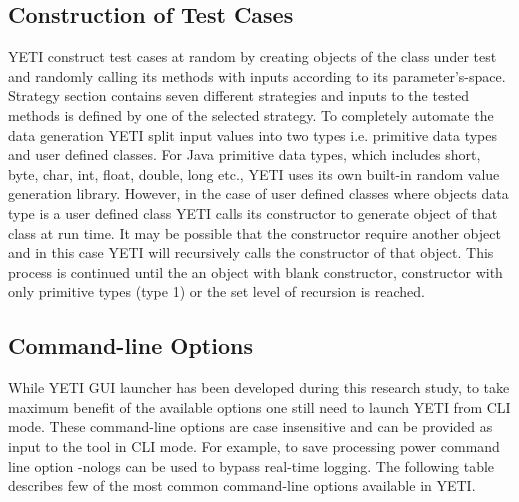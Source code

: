 \subsection{Construction of Test Cases}
YETI construct test cases at random by creating objects of the class under test and randomly calling its methods with inputs according to its parameter's-space. Strategy section contains seven different strategies and inputs to the tested methods is defined by one of the selected strategy. To completely automate the data generation YETI   split input values into two types i.e. primitive data types and user defined classes. For Java primitive data types, which includes short, byte, char, int, float, double, long etc., YETI uses its own built-in random value generation library. However, in the case of user defined classes where objects data type is a user defined class YETI calls its constructor to generate object of that class at run time. It may be possible that the constructor require another object and in this case YETI will recursively calls the constructor of that object. This process is continued until the an object with blank constructor, constructor with only primitive types (type 1) or the set level of recursion is reached. 

\subsection{Command-line Options}
While YETI GUI launcher has been developed during this research study, to take maximum benefit of the available options one still need to launch YETI from CLI mode. These command-line options are case insensitive and can be provided as input to the tool in CLI mode. For example, to save processing power command line option -nologs can be used to bypass real-time logging. The following table describes few of the most common command-line options available in YETI.    

